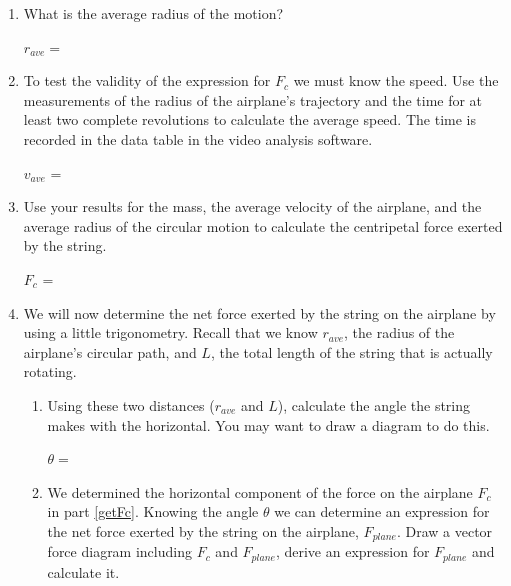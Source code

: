\begin{enumerate}
\item What is the average radius of the motion? \\
\answerspace{2mm}

\hspace{0.5in} $r_{ave} =$

\answerspace{5mm}

\item To test the validity of the expression for \( F_{c} \) we must know the
speed. Use the measurements of the radius of the airplane's trajectory and the
time for at least two complete revolutions to calculate the average speed.
The time is recorded in the data table in the video analysis software.
\answerspace{5mm}

\hspace{0.5in} \( v_{ave} \) = 
\answerspace{5mm}

\item Use your results for the mass, the average velocity of the airplane, and
the average radius of the circular motion to calculate the centripetal force exerted by
the string.\label{getFc}
\answerspace{5mm}

\hspace{0.5in} \( F_{c} \) = 
\answerspace{5mm}

\item We will now determine the net force exerted by the string on the airplane
by using a little trigonometry.
Recall that we know $r_{ave}$, the radius of the airplane's circular path, and 
$L$, the total length of the string that is actually rotating. 

\begin{enumerate}
\item Using these two distances ($r_{ave}$ and $L$), 
calculate the angle the string makes with
the horizontal. You may want to draw a diagram to do this. \\
\answerspace{5mm}

\( \theta  =\)  
\answerspace{5mm}

\item We determined the horizontal component of the force on the airplane 
\( F_{c} \) in part \ref{getFc}. Knowing the angle \( \theta \) we can determine an
expression for the
net force exerted by the string on the airplane, \( F_{plane} \). Draw a vector
force diagram including \( F_{c} \) and \( F_{plane} \), derive an expression
for \( F_{plane} \) and calculate it. \\
\vspace{5mm}


\end{enumerate}
\end{enumerate}
